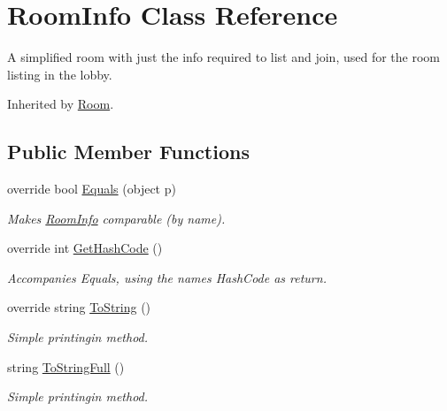 \hypertarget{class_room_info}{}\section{Room\+Info Class Reference}
\label{class_room_info}


A simplified room with just the info required to list and join, used for the room listing in the lobby.  




Inherited by \hyperlink{class_room}{Room}.

\subsection*{Public Member Functions}
\begin{DoxyCompactItemize}
\item 
override bool \hyperlink{class_room_info_aeb8511ae1e05be7879605e4b19152733}{Equals} (object p)
\begin{DoxyCompactList}\small\item\em Makes \hyperlink{class_room_info}{Room\+Info} comparable (by name). \end{DoxyCompactList}\item 
override int \hyperlink{class_room_info_a016c74172ba8d6be63ed46526e0eebd4}{Get\+Hash\+Code} ()
\begin{DoxyCompactList}\small\item\em Accompanies Equals, using the name\textquotesingle{}s Hash\+Code as return. \end{DoxyCompactList}\item 
override string \hyperlink{class_room_info_ad299fe650504477562a3cdf0609aa0eb}{To\+String} ()
\begin{DoxyCompactList}\small\item\em Simple printingin method. \end{DoxyCompactList}\item 
string \hyperlink{class_room_info_a4ad3e14e919adab20770874e5b2a8e5d}{To\+String\+Full} ()
\begin{DoxyCompactList}\small\item\em Simple printingin method. \end{DoxyCompactList}\end{DoxyCompactItemize}
